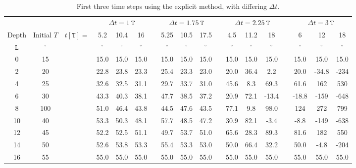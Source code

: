 \begin{table}[h]
    \centering
    \caption{First three time steps using the explicit method, with differing $\Delta t$.}
    \label{tab:explicit}
    \scriptsize
    \begin{tabular}{@{}*{18}c@{}}
        \toprule
        & && \multicolumn{3}{c}{$\Delta t = \SI{1}{\mathtt{T}}$} && \multicolumn{3}{c}{$\Delta t = \SI{1.75}{\mathtt{T}}$} && \multicolumn{3}{c}{$\Delta t = \SI{2.25}{\mathtt{T}}$} && \multicolumn{3}{c}{$\Delta t = \SI{3}{\mathtt{T}}$} \\
        \cmidrule{4-6} \cmidrule{8-10} \cmidrule{12-14} \cmidrule{16-18}
        Depth & Initial $T$ & $t[\mathtt{T}]=$ & 5.2 & 10.4 & 16 && 5.25 & 10.5 & 17.5 && 4.5 & 11.2 & 18 && 6 & 12 & 18 \\
        $\mathtt{L}$ & $^\circ$ && $^\circ$ & $^\circ$ & $^\circ$ && $^\circ$ & $^\circ$ & $^\circ$ && $^\circ$ & $^\circ$ & $^\circ$ && $^\circ$ & $^\circ$ & $^\circ$ \\ 
        \midrule
        0  & 15  && 15.0 & 15.0 & 15.0 && 15.0 & 15.0 & 15.0 && 15.0 & 15.0 &  15.0 && 15.0 & 15.0 & 15.0 \\
        2  & 20  && 22.8 & 23.8 & 23.3 && 25.4 & 23.3 & 23.0 && 20.0 & 36.4 &   2.2 && 20.0 & -34.8 &-234 \\
        4  & 25  && 32.6 & 32.5 & 31.1 && 29.7 & 33.7 & 31.0 && 45.6 &  8.3 &  69.3 && 61.6 &  162 &  530 \\
        6  & 30  && 43.3 & 40.3 & 38.1 && 47.7 & 38.5 & 37.2 && 20.9 & 72.1 & -13.4 &&-18.8 & -159 & -648 \\
        8  & 100 && 51.0 & 46.4 & 43.8 && 44.5 & 47.6 & 43.5 && 77.1 &  9.8 &  98.0 && 124  &  272 &  799 \\
        10 & 40  && 53.3 & 50.3 & 48.1 && 57.7 & 48.5 & 47.2 && 30.9 & 82.1 &  -3.4 && -8.8 & -149 & -638 \\
        12 & 45  && 52.2 & 52.5 & 51.1 && 49.7 & 53.7 & 51.0 && 65.6 & 28.3 &  89.3 && 81.6 &  182 &  550 \\
        14 & 50  && 52.6 & 53.8 & 53.3 && 55.4 & 53.3 & 53.0 && 50.0 & 66.4 &  32.2 && 50.0 & -4.8 & -204 \\
        16 & 55  && 55.0 & 55.0 & 55.0 && 55.0 & 55.0 & 55.0 && 55.0 & 55.0 &  55.0 && 55.0 & 55.0 &   55.0 \\
        \bottomrule
    \end{tabular}
\end{table}